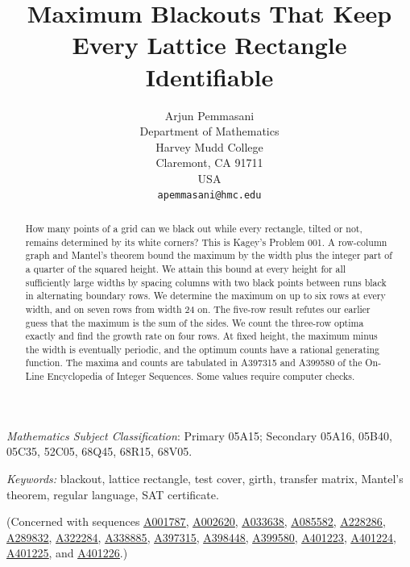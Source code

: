 \documentclass[12pt]{article}
\title{Maximum Blackouts That Keep Every Lattice Rectangle Identifiable}
\author{Arjun Pemmasani\\
Department of Mathematics\\
Harvey Mudd College\\
Claremont, CA 91711\\
USA\\
\texttt{apemmasani@hmc.edu}}
\date{}
\theoremstyle{plain}
\theoremstyle{definition}
\theoremstyle{remark}
\newcommand{\seqnum}[1]{\href{https://oeis.org/#1}{\rm \underline{#1}}}
\begin{document}
\maketitle

\begin{abstract}
How many points of a grid can we black out while every rectangle, tilted or not,
remains determined by its white corners? This is Kagey's Problem 001. A row-column
graph and Mantel's theorem bound the maximum by the width plus the integer part
of a quarter of the squared height. We attain this bound at every height for all
sufficiently large widths by spacing columns with two black points between runs
black in alternating boundary rows. We determine
the maximum on up to six rows at every width, and on seven rows from width 24 on.
The five-row result refutes our earlier guess that the maximum is the sum of the
sides. We count the three-row optima exactly and find the growth rate on four rows.
At fixed height, the maximum minus the width is eventually periodic, and the
optimum counts have a rational generating function. The maxima and counts are
tabulated in A397315 and A399580 of the On-Line Encyclopedia of Integer Sequences.
Some values require computer checks.
\end{abstract}


















 {\it Mathematics Subject Classification}: Primary 05A15; Secondary
05A16, 05B40, 05C35, 52C05, 68Q45, 68R15, 68V05.

\noindent \emph{Keywords:} blackout, lattice rectangle, test cover, girth, transfer
matrix, Mantel's theorem, regular language, SAT certificate.

\noindent (Concerned with sequences
\seqnum{A001787},
\seqnum{A002620},
\seqnum{A033638},
\seqnum{A085582},
\seqnum{A228286},
\seqnum{A289832},
\seqnum{A322284},
\seqnum{A338885},
\seqnum{A397315},
\seqnum{A398448},
\seqnum{A399580},
\seqnum{A401223},
\seqnum{A401224},
\seqnum{A401225}, and
\seqnum{A401226}.)
\end{document}
